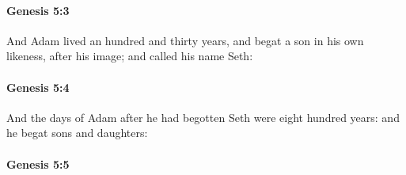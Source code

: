 
		\paragraph{Genesis 5:3} %
			\label{GENESIS-5-3}

			And Adam lived an hundred and thirty years, and begat a son in his own likeness, after his image; and called his name Seth:


		\paragraph{Genesis 5:4} %
			\label{GENESIS-5-4}

			And the days of Adam after he had begotten Seth were eight hundred years: and he begat sons and daughters:


		\paragraph{Genesis 5:5} %
			\label{GENESIS-5-5}

